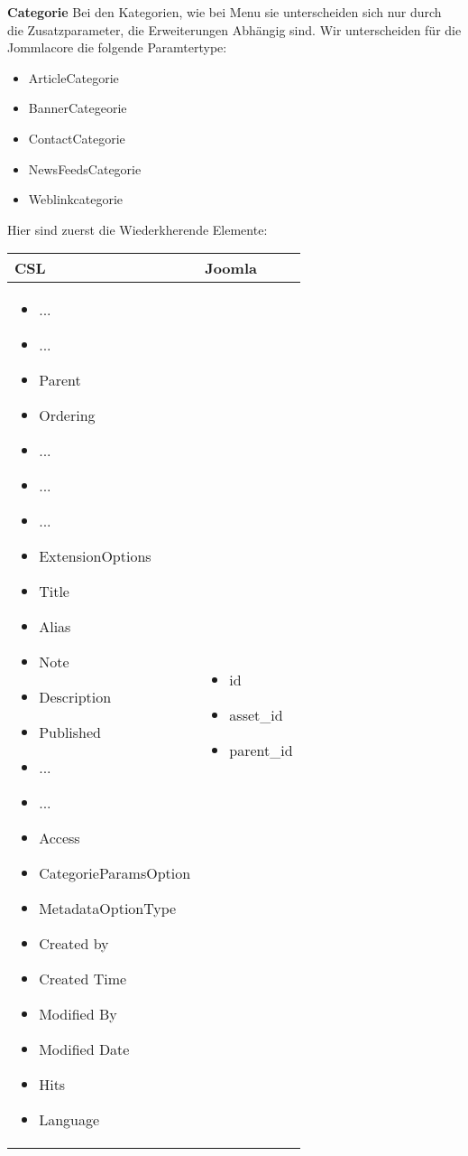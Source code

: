 \textbf{Categorie}
Bei den Kategorien, wie bei Menu sie unterscheiden sich nur durch die Zusatzparameter, die Erweiterungen Abhängig sind. Wir unterscheiden für die Jommlacore die folgende Paramtertype:
\begin{itemize}
\item ArticleCategorie
\item BannerCategeorie
\item ContactCategorie
\item NewsFeedsCategorie
\item Weblinkcategorie 
\end{itemize}
 Hier sind zuerst die Wiederkherende Elemente:
 
\begin{minipage}{0.7\textwidth}
\begin{tabular}{|p{} | p{}|}
\hline
\textbf{CSL} & \textbf{Joomla} \\ 
\hline
\begin{itemize}
\item ...
\item ...
\item Parent
\item Ordering
\item ...
\item ...
\item ...
\item  ExtensionOptions
\item  Title
\item  Alias
\item  Note
\item  Description
\item  Published
\item  ...
\item  ...
\item  Access
\item  CategorieParamsOption
\item  MetadataOptionType
\item  Created by
\item  Created Time
\item  Modified By
\item  Modified Date
\item  Hits
\item  Language
\end{itemize}
 & 
\begin{itemize}
\item id
\item asset\_id
\item parent\_id

\end{itemize}
\end{tabular}
\end{minipage}
